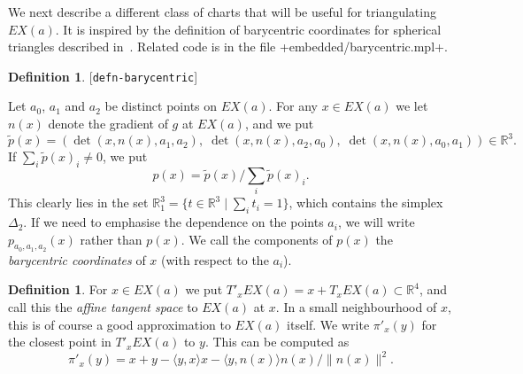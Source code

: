 \documentclass[reqno]{amsart}
\newcommand{\lbl}[1]{\label{#1}\textup{[\texttt{#1}]}\par}
\newcommand{\lbl}{\label}
\newcommand{\Dl}        {\Delta}
\newcommand{\R}         {{\mathbb{R}}}
\newcommand{\ip}[1]     {\langle #1\rangle}
\newcommand{\st}        {\;|\;}
\renewcommand{\:}{\colon}
\theoremstyle{definition}
\newtheorem{definition}[theorem]{Definition}
\begin{document}
We next describe a different class of charts that will be useful for
triangulating $EX(a)$.  It is inspired by the definition of barycentric
coordinates for spherical triangles described in~\cite{labese:sbc}.
Related code is in the file \fname+embedded/barycentric.mpl+.

\begin{definition}\lbl{defn-barycentric}
 Let $a_0$, $a_1$ and $a_2$ be distinct points on $EX(a)$.  For any
 $x\in EX(a)$ we let $n(x)$ denote the gradient of $g$ at $EX(a)$, and we put
 \[ \widetilde{p}(x) =
     (\det(x,n(x),a_1,a_2),\;
      \det(x,n(x),a_2,a_0),\;
      \det(x,n(x),a_0,a_1)) \in \R^3.
 \]
 If $\sum_i\widetilde{p}(x)_i\neq 0$, we put
 \[ p(x) = \widetilde{p}(x)/\sum_i\widetilde{p}(x)_i. \]
 This clearly lies in the set $\R^3_1=\{t\in\R^3\st\sum_it_i=1\}$,
 which contains the simplex $\Dl_2$.  If we need to emphasise the
 dependence on the points $a_i$, we will write $p_{a_0,a_1,a_2}(x)$
 rather than $p(x)$.  We call the components of $p(x)$ the
 \emph{barycentric coordinates} of $x$ (with respect to the $a_i$).
\end{definition}

\begin{definition}
 For $x\in EX(a)$ we put $T'_xEX(a)=x+T_xEX(a)\subset\R^4$, and call this the
 \emph{affine tangent space} to $EX(a)$ at $x$.  In a small neighbourhood
 of $x$, this is of course a good approximation to $EX(a)$ itself.  We
 write $\pi'_x(y)$ for the closest point in $T'_xEX(a)$ to $y$.  This can
 be computed as
 \[ \pi'_x(y) = x+y-\ip{y,x}x-\ip{y,n(x)}n(x)/\|n(x)\|^2. \]
\end{definition}
\end{document}
